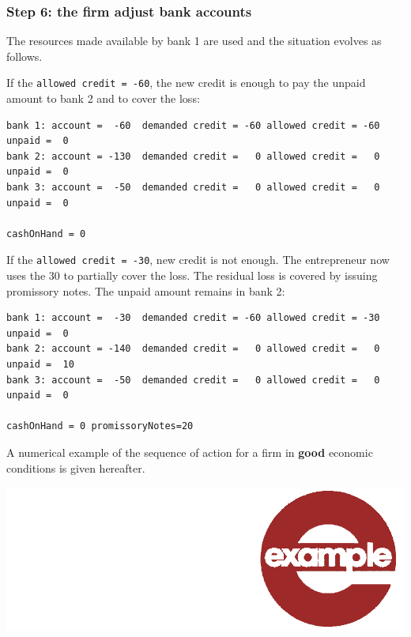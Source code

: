 \documentclass{book}
\newcommand{\doclocation}{file:///Users/giulioni/Documents/workspace/gabriele/docs}
\begin{document}
\subsubsection*{Step 6: the firm adjust bank accounts}

The resources made available by bank 1 are used and the situation evolves as follows.

If the \verb+allowed credit = -60+, the new credit is enough to pay the unpaid amount to bank 2 and to cover the loss:  

\begin{verbatim}
bank 1: account =  -60  demanded credit = -60 allowed credit = -60 unpaid =  0
bank 2: account = -130  demanded credit =   0 allowed credit =   0 unpaid =  0
bank 3: account =  -50  demanded credit =   0 allowed credit =   0 unpaid =  0

cashOnHand = 0
\end{verbatim}

If the \verb+allowed credit = -30+, new credit is not enough. The entrepreneur now uses the 30 to partially cover the loss. The residual loss is covered by issuing promissory notes. The unpaid amount remains in bank 2:

\begin{verbatim}
bank 1: account =  -30  demanded credit = -60 allowed credit = -30 unpaid =  0
bank 2: account = -140  demanded credit =   0 allowed credit =   0 unpaid =  10
bank 3: account =  -50  demanded credit =   0 allowed credit =   0 unpaid =  0

cashOnHand = 0 promissoryNotes=20
\end{verbatim}



\vskip1cm
A numerical example of the sequence of action for a firm in {\bf good} economic conditions is given hereafter. %
\begin{marginfigure}
\hskip8mm	\includegraphics[scale=0.07]{example.png}
\end{marginfigure}
\end{document}
